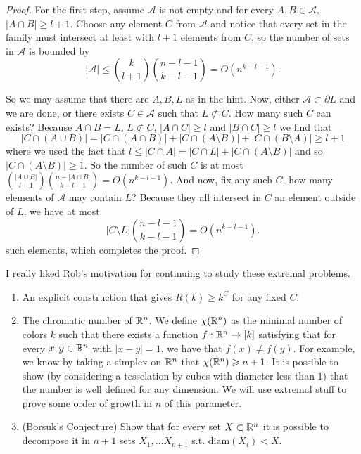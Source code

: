 \begin{proof}
	For the first step, assume $\mathcal{A}$ is not empty and for every
	$A,B \in \mathcal{A}$, $|A \cap B| \geq l+1$.
	Choose any element $C$ from $\mathcal{A}$ and notice that every set
	in the family must intersect at least with $l+1$ elements from $C$,
	so the number of sets in $\mathcal{A}$ is bounded by
	\[
		|\mathcal{A}| \leq \binom{k}{l+1}\binom{n-l-1}{k-l-1} = O(n^{k - l - 1}).
	\]

	So we may assume that there are $A,B,L$ as in the hint. Now, either
	$\mathcal{A} \subset \partial L$ and we are done, or there exists
	$C \in \mathcal{A}$ such that $L \not \subset C$. How many such $C$
	can exists? Because $A \cap B = L$, $L \not \subset C$, $|A \cap C|
	\geq l$ and $|B \cap C| \geq l$
	we find that
	\[
		|C \cap (A \cup B)| = |C \cap (A \cap B)| + |C \cap(A \setminus
		B)| + |C \cap (B \setminus A)| \geq l+1
	\]
	where we used the fact that $l \leq |C \cap A| = |C \cap L| + |C
	\cap (A \setminus B)|$ and so $|C \cap (A \setminus B)| \geq 1$.
	So the number of such $C$ is at most $\binom{|A \cup
	B|}{l+1}\binom{n - |A \cup B|}{k - l - 1} =  O(n^{k - l - 1})$. And
	now, fix any such $C$,
	how many elements of $\mathcal{A}$ may contain $L$? Because they
	all intersect in $C$ an element outside of $L$,
	we have at most
	\[
		|C \setminus L| \binom{n - l - 1}{k - l - 1} = O(n^{k - l - 1}).
	\]
	such elements, which completes the proof.
\end{proof}

I really liked Rob's motivation for continuing to study these extremal problems.

\begin{enumerate}[label=(\alph*)]
	\item An explicit construction that gives $R(k) \geq k^C$ for any fixed $C$!
	\item The chromatic number of $\mathbb{R}^n$. We define $\chi(\mathbb{R}^n)$
		as the minimal number of colors $k$ such that there exists a
		function $f:\mathbb{R}^n \rightarrow [k]$ satisfying
		that for every $x,y \in \mathbb{R}^n$ with $|x-y| = 1$, we have that
		$f(x) \neq f(y)$.
		For example, we know by taking a simplex on $\mathbb{R}^n$ that
		$\chi(\mathbb{R}^n) \geqslant n+1$.
		It is possible to show (by considering a tesselation by cubes
		with diameter less than $1$) that the number is well defined for
		any dimension.
		We will use extremal stuff to prove some order of growth in $n$
		of this parameter.

	\item (Borsuk's Conjecture) Show that for every set $X \subset
		\mathbb{R}^n$ it is possible to decompose it in $n+1$ sets $X_1, \dots X_{n+1}$
		s.t. $\text{diam}(X_i) < X$.
\end{enumerate}

